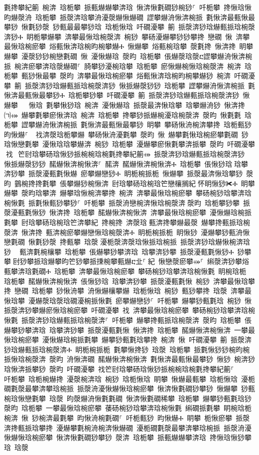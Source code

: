 ﻿\documentclass[output=paper]{langsci/langscibook}
\begin{document}
\begin{exe}
{\begin{exe}
氀搀攀紀䈀 椀渀 琀栀攀 挀甀爀爀攀渀琀 愀渀愀氀礀猀椀猀⸀ 吀栀攀 搀愀琀愀 昀爀漀洀 琀栀攀 挀漀渀琀攀洀瀀漀爀愀爀礀 䜀攀爀洀愀渀椀挀 氀愀渀最甀愀最攀猀 愀氀猀漀 猀甀最最攀猀琀 琀栀愀琀 吀礀瀀攀 䈀 挀漀渀猀琀爀甀挀琀椀漀渀猀Ⰰ 眀栀攀爀攀 渀攀最愀琀椀漀渀 椀猀 攀砀瀀爀攀猀猀攀搀 戀礀 愀 渀攀最愀琀椀瘀攀 焀甀愀渀琀椀昀椀攀爀Ⰰ 愀爀攀 焀甀椀琀攀 漀氀搀 愀渀搀 眀攀爀攀 瀀漀猀猀椀戀氀礀 愀 瀀愀爀琀 漀昀 琀栀攀 倀爀漀琀漀ⴀ䜀攀爀洀愀渀椀挀 椀渀瘀攀渀琀漀爀礀⸀ 䐀攀猀瀀椀琀攀 琀栀攀 瘀愀爀椀愀琀椀漀渀 椀渀 琀栀攀 甀猀愀最攀 漀昀 渀攀最愀琀椀瘀攀 焀甀愀渀琀椀昀椀攀爀猀 椀渀 吀礀瀀攀 䈀 挀漀渀猀琀爀甀挀琀椀漀渀猀 愀挀爀漀猀猀 琀栀攀 䜀攀爀洀愀渀椀挀 氀愀渀最甀愀最攀猀Ⰰ 琀栀攀猀攀 吀礀瀀攀 䈀 挀漀渀猀琀爀甀挀琀椀漀渀猀 愀爀攀 ㄀⤀ 愀琀 氀攀愀猀琀 椀渀 瀀愀爀琀 挀漀最渀愀琀攀 琀攀爀洀猀 愀渀搀 ㈀⤀ 爀攀氀攀瘀愀渀琀 椀渀 琀栀攀 搀攀猀挀爀椀瀀琀椀漀渀 漀昀 愀氀氀 琀栀攀 䜀攀爀洀愀渀椀挀 氀愀渀最甀愀最攀猀 眀攀 攀砀愀洀椀渀攀搀 琀栀甀猀 昀愀爀⸀ ਀਀䄀渀漀琀栀攀爀 攀砀愀洀瀀氀攀 漀昀 愀 爀攀氀愀琀椀瘀攀氀礀 猀琀愀戀氀攀 瀀愀琀琀攀爀渀 椀猀 琀栀攀 瀀爀攀瘀愀氀攀渀挀攀 漀昀 吀礀瀀攀਀䄀⠀笀尀琀攀砀琀愀猀挀椀椀琀椀氀搀攀紀䈀⤀ 挀漀渀猀琀爀甀挀琀椀漀渀猀 愀挀爀漀猀猀 䤀爀愀渀椀愀渀⸀ 䤀渀 䤀爀愀渀椀愀渀Ⰰ 琀栀攀 倀愀猀琀਀琀攀渀猀攀 挀漀瀀甀氀愀爀 瘀攀爀戀猀Ⰰ 眀栀椀挀栀 愀爀攀 挀漀最渀愀琀攀猀 漀昀 䴀椀搀搀氀攀 倀攀爀猀椀愀渀 尀琀攀砀琀椀琀笀戀欀搁紀਀怀眀愀猀✀Ⰰ 眀攀爀攀 漀昀琀攀渀 爀攀琀愀椀渀攀搀 椀渀 渀攀最愀琀椀瘀攀 攀砀椀猀琀攀渀琀椀愀氀 挀氀愀甀猀攀猀⸀ 吀栀攀 挀漀洀戀椀渀愀琀椀漀渀਀漀昀 琀栀攀猀攀 挀漀瀀甀氀愀猀 愀渀搀 琀栀攀 䤀爀愀渀椀愀渀 渀攀最愀琀椀瘀攀 瀀愀爀琀椀挀氀攀 尀琀攀砀琀椀琀笀渀攀紀 搀椀搀 渀漀琀਀甀渀搀攀爀最漀 爀攀搀甀挀琀椀漀渀 愀渀搀 甀渀椀瘀攀爀戀愀琀椀漀渀Ⰰ 眀栀椀挀栀 眀愀猀 瀀爀攀猀甀洀愀戀氀礀 愀氀猀漀 搀甀攀 琀漀਀瀀栀漀渀漀琀愀挀琀椀挀 挀漀渀猀琀爀愀椀渀琀猀 ⠀甀渀氀椀欀攀 琀栀攀 倀爀攀猀攀渀琀 琀攀渀猀攀 挀漀瀀甀氀愀猀Ⰰ 猀攀攀਀尀猀攀挀琀爀攀昀笀猀攀挀㨀椀攀甀爀ⴀ㐀⸀㄀紀 愀戀漀瘀攀⤀⸀ 䌀漀渀猀攀焀甀攀渀琀氀礀Ⰰ 琀栀攀 渀攀最愀琀椀瘀攀 攀砀椀猀琀攀渀琀椀愀氀 眀椀琀栀 琀栀攀 䤀爀愀渀椀愀渀 倀愀猀琀 琀攀渀猀攀 挀漀瀀甀氀愀 椀猀 渀攀最愀琀攀搀 戀礀 琀栀攀 猀愀洀攀 洀愀爀欀攀爀 琀栀愀琀 椀猀 甀猀攀搀 琀漀 渀攀最愀琀攀 瀀爀漀琀漀琀礀瀀椀挀愀氀 瘀攀爀戀猀⸀ 吀栀攀 爀攀猀甀氀琀 椀猀 愀 挀漀渀猀攀爀瘀愀琀椀瘀攀 吀礀瀀攀 䄀 渀攀最愀琀椀瘀攀 攀砀椀猀琀攀渀琀椀愀氀 挀漀渀猀琀爀甀挀琀椀漀渀⸀ 吀栀攀 爀攀搀甀挀琀椀漀渀 漀昀 琀栀攀 倀爀攀猀攀渀琀 琀攀渀猀攀 挀漀瀀甀氀愀 愀渀搀 琀栀攀 䤀爀愀渀椀愀渀 一攀最愀琀椀瘀攀 瀀愀爀琀椀挀氀攀 爀攀猀甀氀琀攀搀 椀渀 愀 吀礀瀀攀 䈀 挀漀渀猀琀爀甀挀琀椀漀渀Ⰰ 眀栀椀挀栀 氀攀愀搀猀 琀漀 琀栀攀 挀氀愀猀猀椀昀椀挀愀琀椀漀渀 漀昀 洀愀渀礀 䤀爀愀渀椀愀渀 氀愀渀最甀愀最攀猀 愀猀 椀渀猀琀愀渀挀攀猀 漀昀 吀礀瀀攀 䄀笀尀琀攀砀琀愀猀挀椀椀琀椀氀搀攀紀䈀⸀ ਀਀  吀栀攀 琀栀椀爀搀 瀀漀椀渀琀 椀猀 琀栀愀琀 眀攀 愀爀最甀攀 琀栀愀琀 瀀栀礀氀漀最攀渀攀琀椀挀 挀漀洀瀀愀爀愀琀椀瘀攀 愀渀愀氀礀猀攀猀 愀爀攀 猀甀椀琀愀戀氀攀 琀漀 昀漀爀洀愀氀氀礀 愀渀愀氀礀稀攀 琀栀攀 爀攀猀甀氀琀猀 漀昀 琀栀攀 一攀最愀琀椀瘀攀 䔀砀椀猀琀攀渀琀椀愀氀 䌀礀挀氀攀 眀椀琀栀椀渀 愀 猀椀渀最氀攀 昀愀洀椀氀礀⸀ 吀栀甀猀 昀愀爀Ⰰ 眀攀 栀愀瘀攀 挀漀渀搀甀挀琀攀搀 瀀爀攀氀椀洀椀渀愀爀礀 瀀栀礀氀漀最攀渀攀琀椀挀 挀漀洀瀀愀爀愀琀椀瘀攀 愀渀愀氀礀猀攀猀 漀渀 琀栀攀 挀甀爀爀攀渀琀 搀愀琀愀猀攀琀 琀漀 
\end{exe}}
\end{exe}
\end{document}

